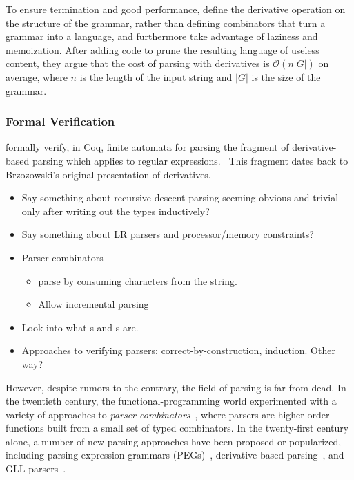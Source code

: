       To ensure termination and good performance, \citeauthor*{Derivs} define the derivative operation on the structure of the grammar, rather than defining combinators that turn a grammar into a language, and furthermore take advantage of laziness and memoization.  After adding code to prune the resulting language of useless content, they argue that the cost of parsing with derivatives is $\mathcal O(n|G|)$ on average, where $n$ is the length of the input string and $|G|$ is the size of the grammar.
      
    \subsubsection{Formal Verification}
       formally verify, in Coq, finite automata for parsing the fragment of derivative-based parsing which applies to regular expressions.~\cite{DerivsCoq}  This fragment dates back to Brzozowski's original presentation of derivatives.~\cite{BrzozowskiDerivs}
      
  
  \begin{itemize}
    \item Say something about recursive descent parsing seeming obvious and trivial only after writing out the types inductively?
    \item Say something about LR parsers and processor/memory constraints?
    \item Parser combinators
      \begin{itemize}
        \item parse by consuming characters from the string.
        \item Allow incremental parsing
      \end{itemize}
    \item Look into what \cite{PEG}s and \cite{GLL}s are.
    \item Approaches to verifying parsers: correct-by-construction, induction.  Other way?  
  \end{itemize}

  
    However, despite rumors to the contrary, the field of parsing is far from dead.  In the twentieth century, the functional-programming world experimented with a variety of approaches to \emph{parser combinators}~\cite{pcomb}, where parsers are higher-order functions built from a small set of typed combinators.  In the twenty-first century alone, a number of new parsing approaches have been proposed or popularized, including parsing expression grammars (PEGs)~\cite{PEG}, derivative-based parsing~\cite{Derivs}, and GLL parsers~\cite{GLL}.

